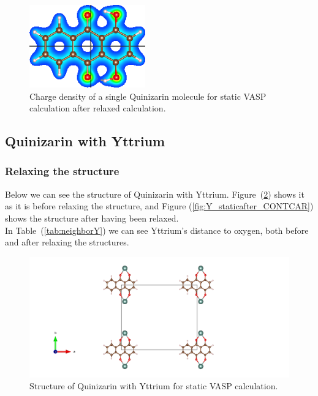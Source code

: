 \documentclass{article}
\begin{document}
      \begin{figure}[H]
        \centering
        \includegraphics[width = 5cm]{../fig/basic_staticafter_CHGDENSITY.png}
        \caption{Charge density of a single Quinizarin molecule for static VASP calculation after relaxed calculation. }
        \label{fig:basic_staticafter_CHGDENSITY}
      \end{figure}

      \vspace{1cm}

  \subsection{Quinizarin with Yttrium}

    \subsubsection{Relaxing the structure}

      Below we can see the structure of Quinizarin with Yttrium. Figure~(\ref{fig:Y_staticbefore_CONTCAR}) shows it as it is before relaxing the structure, and Figure (\ref{fig:Y_staticafter_CONTCAR}) shows the structure after having been relaxed. \\

      In Table~(\ref{tab:neighborY}) we can see Yttrium's distance to oxygen, both before and after relaxing the structures. \\

      \begin{figure}[H]
        \centering
        \includegraphics[width = \textwidth]{../fig/Y_staticbefore_CONTCAR.png}
        \caption{Structure of Quinizarin with Yttrium for static VASP calculation. }
        \label{fig:Y_staticbefore_CONTCAR}
      \end{figure}
\end{document}
